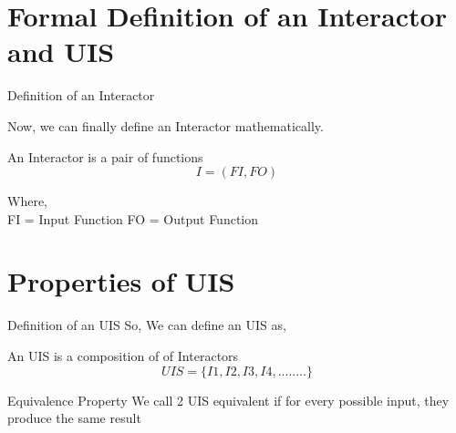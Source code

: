 \documentclass{beamer}
\begin{document}
\section{Formal Definition of an Interactor and UIS}
\begin{frame}{Definition of an Interactor}
	
	Now, we can finally define an Interactor mathematically.
	\begin{block}{An Interactor is a pair of functions}
		$$ I = (FI,FO) $$
	\end{block}
	
	Where,\\
	
	 FI = Input Function 
	 FO = Output Function 
	
	
\end{frame}




	\section{Properties of UIS}
	
	\begin{frame}{Definition of an UIS}
	So, We can define an UIS as,
		
		\begin{block}{An UIS is a composition of of Interactors}
			$$ UIS =  \{I1,I2,I3,I4,........\}  $$
		\end{block}

		\begin{block}{Equivalence Property}
		We call 2 UIS equivalent if for every possible input, they produce the same result
		\end{block}
	 
	\end{frame}
   	
\end{document}

